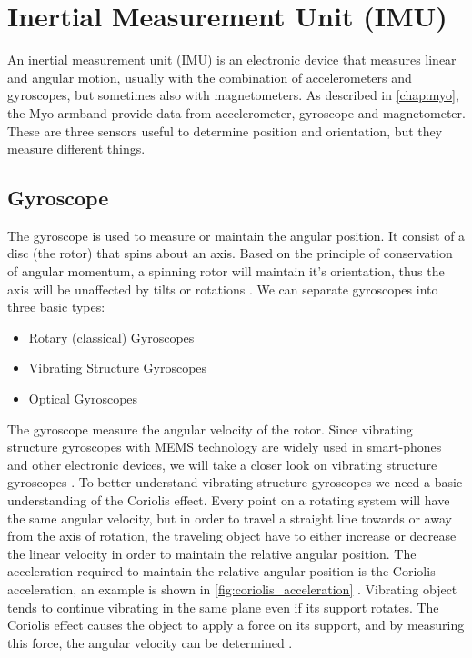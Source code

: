 \section{Inertial Measurement Unit (IMU)}
An inertial measurement unit (IMU) is an electronic device that measures linear and angular motion, usually with the combination of accelerometers and gyroscopes, but sometimes also with magnetometers. As described in \cref{chap:myo}, the Myo armband provide data from accelerometer, gyroscope and magnetometer. These are three sensors useful to determine position and orientation, but they measure different things.

\subsection{Gyroscope}
The gyroscope is used to measure or maintain the angular position. It consist of a disc (the rotor) that spins about an axis. Based on the principle of conservation of angular momentum, a spinning rotor will maintain it's orientation, thus the axis will be unaffected by tilts or rotations \cite{gyroscope_demonstration_project}. We can separate gyroscopes into three basic types:

\begin{itemize}
    \item Rotary (classical) Gyroscopes
    \item Vibrating Structure Gyroscopes
    \item Optical Gyroscopes
\end{itemize}

The gyroscope measure the angular velocity of the rotor. Since vibrating structure gyroscopes with MEMS technology are widely used in smart-phones and other electronic devices, we will take a closer look on vibrating structure gyroscopes \cite{wiki:Vibrating_structure_gyroscope}. To better understand vibrating structure gyroscopes we need a basic understanding of the Coriolis effect. Every point on a rotating system will have the same angular velocity, but in order to travel a straight line towards or away from the axis of rotation, the traveling object have to either increase or decrease the linear velocity in order to maintain the relative angular position. The acceleration required to maintain the relative angular position is the Coriolis acceleration, an example is shown in \cref{fig:coriolis_acceleration} \cite{vibrating_structure_gyroscope}. Vibrating object tends to continue vibrating in the same plane even if its support rotates. The Coriolis effect causes the object to apply a force on its support, and by measuring this force, the angular velocity can be determined \cite{wiki:Vibrating_structure_gyroscope}.

